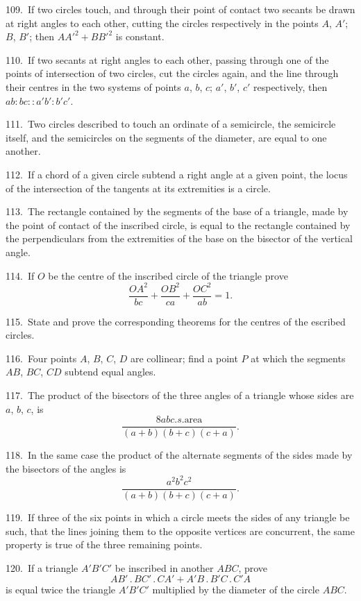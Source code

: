 \documentclass[oneside]{book}
\begin{document}
\begin{footnotesize}
109.~If two circles touch, and through their point of contact
two secants be drawn at right angles to each other, cutting the
circles respectively in the points $A$, $A'$; $B$, $B'$; then $AA'^2 + BB'^2$
is constant.

110.~If two secants at right angles to each other, passing through
one of the points of intersection of two circles, cut the circles
again, and the line through their centres in the two systems of
points $a$, $b$, $c$; $a'$, $b'$, $c'$ respectively, then $ab : bc : : a'b' : b'c'$.

111.~Two circles described to touch an ordinate of a semicircle,
the semicircle itself, and the semicircles on the segments
of the diameter, are equal to one another.

112.~If a chord of a given circle subtend a right angle at
a given point, the locus of the intersection of the tangents at
its extremities is a circle.

113.~The rectangle contained by the segments of the base of a
triangle, made by the point of contact of the inscribed circle, is
equal to the rectangle contained by the perpendiculars from the
extremities of the base on the bisector of the vertical angle.


114.~If $O$ be the centre of the inscribed circle of the triangle
prove
\[
\frac{OA^{2}}{bc} + \frac{OB^{2}}{ca} + \frac{OC^{2}}{ab} = 1.
\]

115.~State and prove the corresponding theorems for the
centres of the escribed circles.

116.~Four points $A$, $B$, $C$, $D$ are collinear; find a point $P$ at
which the segments $AB$, $BC$, $CD$ subtend equal angles.

117.~The product of the bisectors of the three angles of a triangle
whose sides are $a$, $b$, $c$, is
\[
  \frac{8 abc.s.\text{area} }
       {  (a+b)(b+c)(c+a)   }.
\]

118.~In the same case the product of the alternate segments of
the sides made by the bisectors of the angles is
\[
  \frac{ a^2 b^2 c^2 }
       {  (a+b)(b+c)(c+a)              }.
\]

119.~If three of the six points in which a circle meets the sides
of any triangle be such, that the lines joining them to the opposite
vertices are concurrent, the same property is true of the three
remaining points.

120.~If a triangle $A'B'C'$ be inscribed in another $ABC$, prove
\[
AB'\,.\,BC'\,.\,CA' + A'B\,.\,B'C\,.\,C'A
\]
is equal twice the triangle $A'B'C'$ multiplied by the diameter of
the circle $ABC$.


\end{footnotesize}
\end{document}
